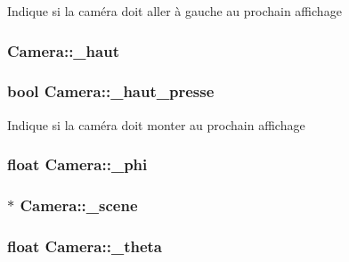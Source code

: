 Indique si la caméra doit aller à gauche au prochain affichage \hypertarget{class_camera_af860db197a7abbf0284df4e32a95a347}{
\subsubsection[{\+\_\+haut}]{ Camera\+::\+\_\+haut\hspace{0.3cm}{\ttfamily [protected]}}}\label{class_camera_af860db197a7abbf0284df4e32a95a347}
\hypertarget{class_camera_a43b59b53cb182906d56e6e4d2c31139c}{
\subsubsection[{\+\_\+haut\+\_\+presse}]{\setlength{\rightskip}{0pt plus 5cm}bool Camera\+::\+\_\+haut\+\_\+presse}}\label{class_camera_a43b59b53cb182906d56e6e4d2c31139c}
Indique si la caméra doit monter au prochain affichage \hypertarget{class_camera_a288df53a3ff446ee4367ee47b8499fcd}{
\subsubsection[{\+\_\+phi}]{\setlength{\rightskip}{0pt plus 5cm}float Camera\+::\+\_\+phi\hspace{0.3cm}{\ttfamily [protected]}}}\label{class_camera_a288df53a3ff446ee4367ee47b8499fcd}
\hypertarget{class_camera_a81ffb00eedbaefbfb755b0c13d42180a}{
\subsubsection[{\+\_\+scene}]{$\ast$ Camera\+::\+\_\+scene\hspace{0.3cm}{\ttfamily [protected]}}}\label{class_camera_a81ffb00eedbaefbfb755b0c13d42180a}
\hypertarget{class_camera_aeb3c859c3c254c8296420451259e5629}{
\subsubsection[{\+\_\+theta}]{\setlength{\rightskip}{0pt plus 5cm}float Camera\+::\+\_\+theta\hspace{0.3cm}{\ttfamily [protected]}}}\label{class_camera_aeb3c859c3c254c8296420451259e5629}
